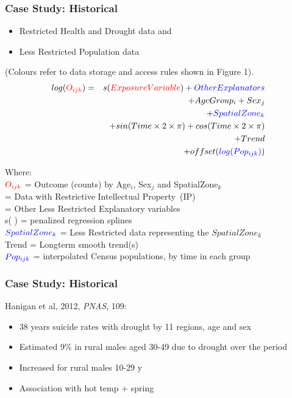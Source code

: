 \documentclass[bigger]{beamer}
\begin{document}
\begin{frame}
\frametitle{Case Study: Historical}
\label{sec-2-7}

\begin{footnotesize}
\begin{itemize}
\item {\color{red}Restricted Health and Drought data} and 
\item {\color{blue}Less Restricted Population data} 
\end{itemize}
(Colours refer to data storage and access rules shown in Figure 1).
\begin{eqnarray*}
        log({\color{red} O_{ijk}})  & = & s({\color{red}ExposureVariable})  + {\color{blue} OtherExplanators}  \\
        & &   + AgeGroup_{i} + Sex_{j} \\
        & &   + {\color{blue} SpatialZone_{k}}  \\
        & &  + sin(Time \times 2 \times \pi) + cos(Time \times 2 \times \pi) \\
        & &  + Trend \\
        & &   + offset({\color{blue} log(Pop_{ijk})})\\
\end{eqnarray*}
\end{footnotesize}
\begin{tiny}
\noindent Where:\\
        \indent ${\color{red}O_{ijk}}$ = Outcome (counts) by Age$_{i}$, Sex$_{j}$ and SpatialZone$_{k}$ \\
         = Data with {\color{red}Restrictive Intellectual Property~(IP)} \\
         = Other {\color{blue}Less Restricted}  Explanatory variables \\
        \indent s( ) = penalized regression splines \\
        \indent ${\color{blue} SpatialZone_{k}}$  = {\color{blue} Less Restricted} data representing the $SpatialZone_{k}$  \\
        \indent Trend = Longterm smooth trend(s) \\
        \indent ${\color{blue}Pop_{ijk}}$ = interpolated Census populations, by time in each group\\
\end{tiny}
\end{frame}
\begin{frame}
\frametitle{Case Study: Historical}
\label{sec-2-8}

Hanigan et al, 2012, \emph{PNAS}, 109:
\begin{itemize}
\item 38 years suicide rates with drought by 11 regions, age and sex
\item Estimated 9\% in rural males aged 30-49 due to drought over the period
\item Increased for rural males 10-29 y
\item Association with hot temp + spring
\end{itemize}
\end{frame}
\end{document}
